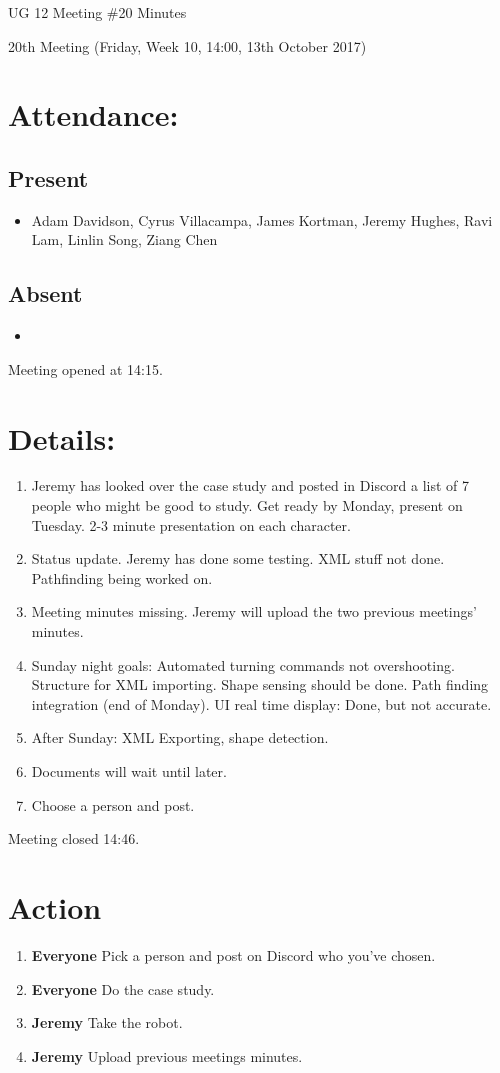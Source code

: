 \documentclass{article}
\begin{document}
\begin{adjustwidth}{2.5em}{0pt}
\begin{center}
\Large{UG 12 Meeting \#20 Minutes}\\
\end{center}
\end{adjustwidth}

20th Meeting (Friday, Week 10, 14:00, 13th October 2017)
\section{Attendance:}
\subsection*{Present}
\begin{itemize}
\item Adam Davidson, Cyrus Villacampa, James Kortman, Jeremy Hughes, Ravi Lam, Linlin Song, Ziang Chen
\end{itemize}
\subsection*{Absent}
\begin{itemize}
\item 
\end {itemize}

Meeting opened at 14:15.
\section{Details:}
\begin{enumerate}
\item Jeremy has looked over the case study and posted in Discord a list of 7 people who might be good to study. Get ready by Monday, present on Tuesday. 2-3 minute presentation on each character.
\item Status update. Jeremy has done some testing. XML stuff not done. Pathfinding being worked on. 
\item Meeting minutes missing. Jeremy will upload the two previous meetings’ minutes.
\item Sunday night goals: Automated turning commands not overshooting. Structure for XML importing. Shape sensing should be done. Path finding integration (end of Monday). UI real time display: Done, but not accurate. 
\item After Sunday: XML Exporting, shape detection.
\item Documents will wait until later.
\item Choose a person and post.
\end{enumerate}
Meeting closed 14:46.

\section{Action}
\begin{enumerate}
\item \textbf{Everyone} Pick a person and post on Discord who you've chosen.
\item \textbf{Everyone} Do the case study.
\item \textbf{Jeremy} Take the robot.
\item \textbf{Jeremy} Upload previous meetings minutes.
\end{enumerate}
\end{document}
